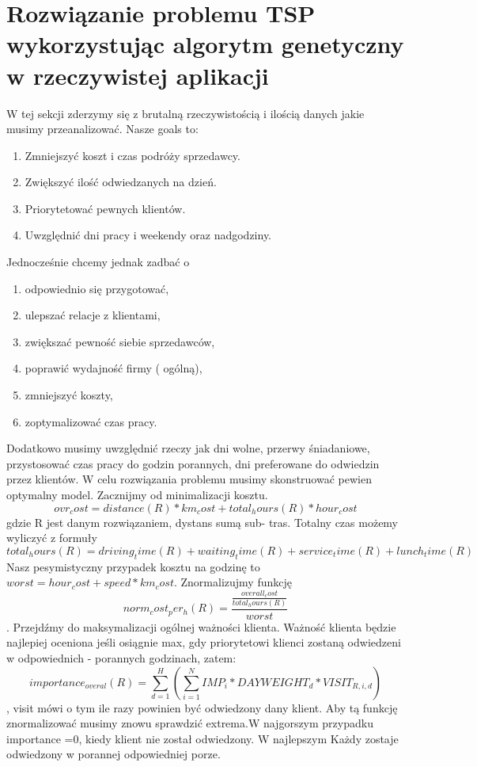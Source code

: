 \documentclass[11pt]{article}
\begin{document}
\section{Rozwiązanie problemu TSP wykorzystując algorytm genetyczny w rzeczywistej aplikacji}
W tej sekcji zderzymy się z brutalną rzeczywistością i ilością danych jakie musimy przeanalizować. Nasze goals to:\\
\begin{enumerate}
\item Zmniejszyć koszt i czas podróży sprzedawcy.
\item Zwiększyć ilość odwiedzanych na dzień.
\item Priorytetować pewnych klientów.
\item Uwzględnić dni pracy i weekendy oraz nadgodziny.
\end{enumerate}
Jednocześnie chcemy jednak zadbać o \begin{enumerate}
\item odpowiednio się przygotować,
\item ulepszać relacje z klientami,
\item zwiększać pewność siebie sprzedawców,
\item poprawić wydajność firmy ( ogólną),
\item zmniejszyć koszty,
\item zoptymalizować czas pracy.
\end{enumerate}
Dodatkowo musimy uwzględnić rzeczy jak  dni wolne, przerwy śniadaniowe, przystosować czas pracy do godzin porannych, dni preferowane do odwiedzin przez klientów.
W celu rozwiązania problemu musimy skonstruować pewien optymalny model. Zacznijmy od minimalizacji kosztu. 
$$ ovr_cost = distance(R) * km_cost + total_hours(R) * hour_cost$$
gdzie R jest danym rozwiązaniem, dystans sumą sub- tras. Totalny czas możemy wyliczyć z formuły 
$$ total_hours(R)=driving_time(R)+waiting_time(R) + service_time(R)+lunch_time(R)$$ Nasz pesymistyczny przypadek kosztu na godzinę to $worst = hour_cost + speed * km_cost$. Znormalizujmy funkcję
$$norm_cost_per_h(R)= \frac{\frac{overall_cost}{total_hours(R)}}{worst}$$. Przejdźmy do maksymalizacji ogólnej ważności klienta. Ważność klienta będzie najlepiej oceniona jeśli osiągnie max, gdy priorytetowi klienci zostaną odwiedzeni w odpowiednich - porannych godzinach, zatem:\\
$$ importance_{overal}(R)=\sum^H_{d=1}(\sum^N_{i=1}IMP_i * DAYWEIGHT_d * VISIT_{R,i,d})$$, visit mówi o tym ile razy powinien być odwiedzony dany klient. Aby tą funkcję znormalizować musimy znowu sprawdzić extrema.W najgorszym przypadku importance =0, kiedy klient nie został odwiedzony. W najlepszym Każdy zostaje odwiedzony w porannej odpowiedniej porze.
\end{document}
